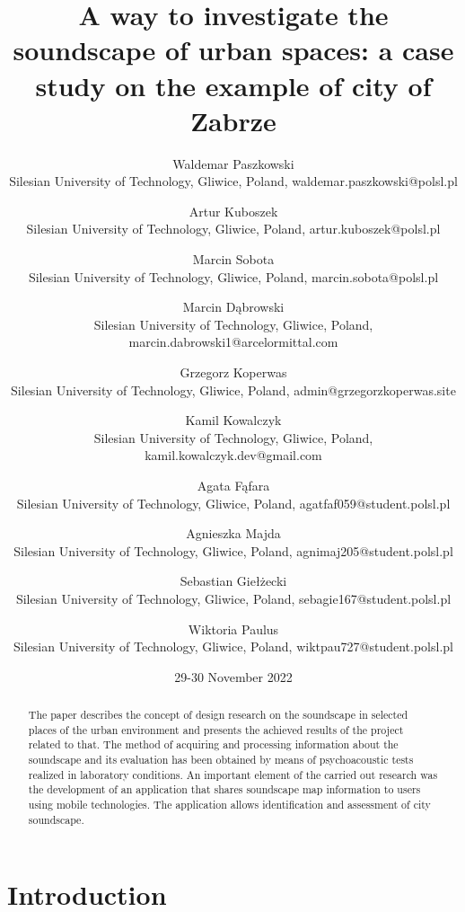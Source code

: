 \documentclass[a4paper,10pt]{article}
\title{A way to investigate the soundscape of urban spaces: a case study on the example of city of Zabrze}
\author{
    Waldemar Paszkowski \\
    Silesian University of Technology, Gliwice, Poland, waldemar.paszkowski@polsl.pl
  \and 
    Artur Kuboszek \\
    Silesian University of Technology, Gliwice, Poland, artur.kuboszek@polsl.pl
  \and 
    Marcin Sobota \\
    Silesian University of Technology, Gliwice, Poland, marcin.sobota@polsl.pl
  \and 
    Marcin Dąbrowski \\
    Silesian University of Technology, Gliwice, Poland, marcin.dabrowski1@arcelormittal.com
  \and 
    Grzegorz Koperwas \\
    Silesian University of Technology, Gliwice, Poland, admin@grzegorzkoperwas.site
  \and 
    Kamil Kowalczyk \\
    Silesian University of Technology, Gliwice, Poland, kamil.kowalczyk.dev@gmail.com
  \and 
    Agata Fąfara \\
    Silesian University of Technology, Gliwice, Poland, agatfaf059@student.polsl.pl
  \and 
    Agnieszka Majda \\
    Silesian University of Technology, Gliwice, Poland, agnimaj205@student.polsl.pl
  \and 
    Sebastian Giełżecki \\
    Silesian University of Technology, Gliwice, Poland, sebagie167@student.polsl.pl
  \and 
    Wiktoria Paulus \\
    Silesian University of Technology, Gliwice, Poland, wiktpau727@student.polsl.pl
}
\date{29-30 November 2022}
\begin{document}
\maketitle

\thispagestyle{fancy}

\begin{abstract}
The paper describes the concept of design research on the soundscape in selected
places of the urban environment and presents the achieved results of the project
related to that. The method of acquiring and processing information about the
soundscape and its evaluation has been obtained by means of psychoacoustic tests
realized in laboratory conditions. An important element of the carried out
research was the development of an application that shares soundscape map
information to users using mobile technologies. The application allows
identification and assessment of city soundscape.
\end{abstract}


\section*{Introduction}
\end{document}

